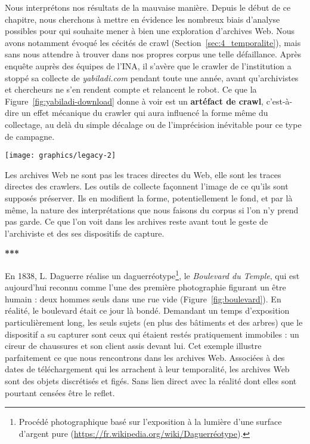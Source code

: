 \documentclass[symmetric,justified,marginals=raggedouter]{tufte-book}
\begin{document}
Nous interprétons nos résultats de la mauvaise manière. Depuis le début de ce chapitre, nous cherchons à mettre en évidence les nombreux biais d'analyse possibles pour qui souhaite mener à bien une exploration d'ar\-chives Web. Nous avons notamment évoqué les cécités de crawl (Section~\ref{sec:4_temporalite}), mais sans nous attendre à trouver dans nos propres corpus une telle défaillance. Après enquête auprès des équipes de l'INA, il s'avère que le crawler de l'institution a stoppé sa collecte de \textit{yabiladi.com} pendant toute une année, avant qu'archivistes et chercheurs ne s'en rendent compte et relancent le robot. Ce que la Figure~\ref{fig:yabiladi-download} donne à voir est un \textbf{artéfact de crawl}, c'est-à-dire un effet mécanique du crawler qui aura influencé la forme même du collectage, au delà du simple décalage ou de l'imprécision inévitable pour ce type de campagne. 

\begin{figure*}
  \centering
  \texttt{[image: graphics/legacy-2]}
  \caption{\textit{Boulevard du Temple}, Louis Daguerre, 1838}
  \label{fig:boulevard}
\end{figure*}

\noindent Les archives Web ne sont pas les traces directes du Web, elle sont les traces directes des crawlers. Les outils de collecte façonnent l'image de ce qu'ils sont supposés préserver. Ils en modifient la forme, potentiellement le fond, et par là même, la nature des interprétations que nous faisons du corpus si l'on n'y prend pas garde. Ce que l'on voit dans les archives reste avant tout le geste de l'archiviste et des ses dispositifs de capture. 

\begin{center}
	\textbf{***}
\end{center}

\noindent En 1838, L. Daguerre réalise un daguerréotype\footnote{\RaggedOuter Procédé photographique basé sur l'exposition à la lumière d'une surface d'argent pure (\url{https://fr.wikipedia.org/wiki/Daguerréotype}).}, le \textit{Boulevard du Temple}, qui est aujourd'hui reconnu comme l'une des première photographie figurant un être humain : deux hommes seuls dans une rue vide (Figure~\ref{fig:boulevard}). En réalité, le boulevard était ce jour là bondé. Demandant un temps d'exposition particulièrement long, les seuls sujets (en plus des bâtiments et des arbres) que le dispositif a su capturer sont ceux qui étaient restés pratiquement immobiles : un cireur de chaussures et son client assis devant lui. Cet exemple illustre parfaitement ce que nous rencontrons dans les archives Web. Associées à des dates de téléchargement qui les arrachent à leur temporalité, les archives Web sont des objets discrétisés et figés. Sans lien direct avec la réalité dont elles sont pourtant censées être le reflet. 
\end{document}
